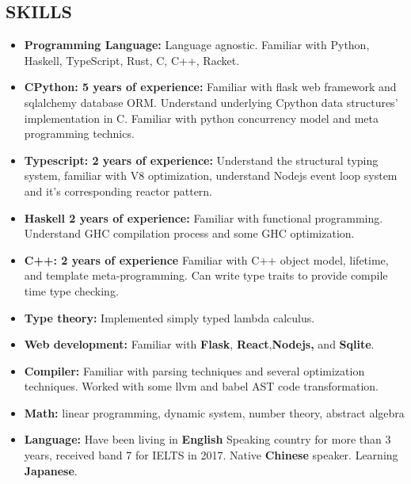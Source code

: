 \documentclass{res}
\begin{document}
\begin{resume}
\section{SKILLS}
    \begin{itemize}[leftmargin=-.2in]
        \setlength\itemsep{-1em}
        \item \textbf{Programming Language:} Language agnostic. Familiar with Python, Haskell, TypeScript, Rust, C, C++, Racket.\\
        \item \textbf{CPython: 5 years of experience:} Familiar with flask web framework and sqlalchemy database ORM.
                  Understand underlying Cpython data structures' implementation in C.
                  Familiar with python concurrency model and meta programming technics. \\
        \item \textbf{Typescript: 2 years of experience:} Understand the structural typing system, familiar with V8 optimization, understand Nodejs event loop system and it's corresponding reactor pattern. \\
        \item \textbf{Haskell 2 years of experience:} Familiar with functional programming. Understand GHC compilation process and some GHC optimization. \\
        \item \textbf{C++: 2 years of experience} Familiar with C++ object model, lifetime, and template meta-programming. Can write type traits to provide compile time type checking. \\
        \item \textbf{Type theory:} Implemented simply typed lambda calculus. \\
        \item \textbf{Web development:} Familiar with \textbf{Flask}, \textbf{React},\textbf{Nodejs,} and \textbf{Sqlite}. \\
        \item \textbf{Compiler:} Familiar with parsing techniques and several optimization techniques. Worked with some llvm and babel AST code transformation. \\
        \item \textbf{Math:} linear programming, dynamic system, number theory, abstract algebra \\
        \item \textbf{Language:} Have been living in \textbf{English} Speaking country for more than 3 years, received band 7 for IELTS in 2017. Native \textbf{Chinese} speaker. Learning \textbf{Japanese}.
    \end{itemize}

\end{resume}
\end{document}
